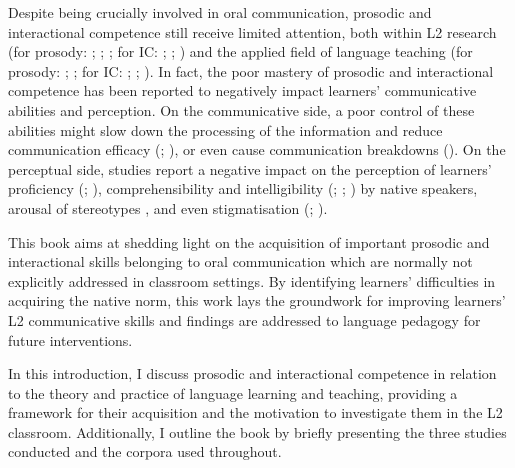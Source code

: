 Despite being crucially involved in oral communication, prosodic and interactional competence still receive limited attention, both within L2 research (for prosody: \citealt{DerwingMunro2015}; \citealt{Gut2009}; \citealt{Mennen2004}; for IC: \citealt{Cekaite2007}; \citealt{Galaczi2014}; \citealt{YamamotoEtAl2015}) and the applied field of language teaching (for prosody: \citealt{Aronsson2014}; \citealt{PiccardoNorth2017}; for IC: \citealt{Campbell-Larsen2022}; \citealt{Cohen2005}; \citealt{VanCompernolleSoria2020}). In fact, the poor mastery of prosodic and interactional competence has been reported to negatively impact learners’ communicative abilities and perception. On the communicative side, a poor control of these abilities might slow down the processing of the information and reduce communication efficacy (\citealt{SørensenEtAl2019}; \citealt{SongIverson2018}), or even cause communication breakdowns (\citealt{SbrannaEtAl2020}). On the perceptual side, studies report a negative impact on the perception of learners’ proficiency (\citealt{VanOsEtAl2020}; \citealt{TrofimovichBaker2007}), comprehensibility and intelligibility (\citealt{MunroDerwing1999}; \citealt{Kang2010}; \citealt{Hahn2004}) by native speakers, arousal of stereotypes \citep{Nakane2007}, and even stigmatisation (\citealt{Munro2003}; \citealt{Piske2012}).

This book aims at shedding light on the acquisition of important prosodic and interactional skills belonging to oral communication which are normally not explicitly addressed in classroom settings. By identifying learners’ difficulties in acquiring the native norm, this work lays the groundwork for improving learners’ L2 communicative skills and findings are addressed to language pedagogy for future interventions.

In this introduction, I discuss prosodic and interactional competence in relation to the theory and practice of language learning and teaching, providing a framework for their acquisition and the motivation to investigate them in the L2 classroom. Additionally, I outline the book by briefly presenting the three studies conducted and the corpora used throughout.

